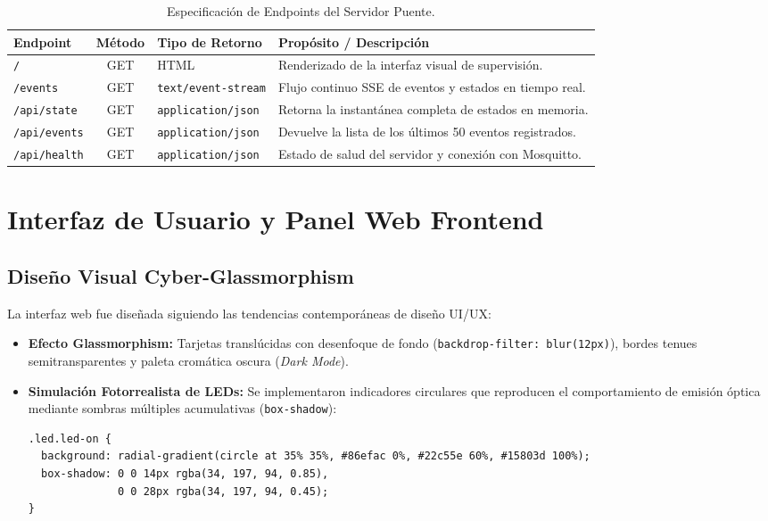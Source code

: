 \documentclass[11pt,a4paper]{article}
\begin{document}
\begin{table}[htbp]
    \centering
    \caption{Especificación de Endpoints del Servidor Puente.}
    \label{tab:endpoints}
    \begin{tabularx}{\textwidth}{l c l X}
        \toprule
        \textbf{Endpoint} & \textbf{Método} & \textbf{Tipo de Retorno} & \textbf{Propósito / Descripción} \\
        \midrule
        \texttt{/} & GET & HTML & Renderizado de la interfaz visual de supervisión. \\
        \texttt{/events} & GET & \texttt{text/event-stream} & Flujo continuo SSE de eventos y estados en tiempo real. \\
        \texttt{/api/state} & GET & \texttt{application/json} & Retorna la instantánea completa de estados en memoria. \\
        \texttt{/api/events} & GET & \texttt{application/json} & Devuelve la lista de los últimos 50 eventos registrados. \\
        \texttt{/api/health} & GET & \texttt{application/json} & Estado de salud del servidor y conexión con Mosquitto. \\
        \bottomrule
    \end{tabularx}
\end{table}

\section{Interfaz de Usuario y Panel Web Frontend}

\subsection{Diseño Visual Cyber-Glassmorphism}
La interfaz web fue diseñada siguiendo las tendencias contemporáneas de diseño UI/UX:
\begin{itemize}
    \item \textbf{Efecto Glassmorphism:} Tarjetas translúcidas con desenfoque de fondo (\texttt{backdrop-filter: blur(12px)}), bordes tenues semitransparentes y paleta cromática oscura (\textit{Dark Mode}).
    \item \textbf{Simulación Fotorrealista de LEDs:} Se implementaron indicadores circulares que reproducen el comportamiento de emisión óptica mediante sombras múltiples acumulativas (\texttt{box-shadow}):
    \begin{lstlisting}[language=html, caption={Estilo CSS del LED activo con dispersión de brillo}]
.led.led-on {
  background: radial-gradient(circle at 35% 35%, #86efac 0%, #22c55e 60%, #15803d 100%);
  box-shadow: 0 0 14px rgba(34, 197, 94, 0.85),
              0 0 28px rgba(34, 197, 94, 0.45);
}
    \end{lstlisting}
\end{itemize}
\end{document}
